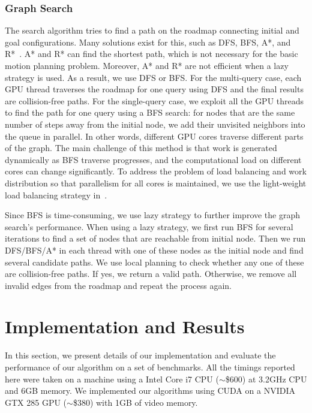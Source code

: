 \subsubsection{Graph Search}
The search algorithm tries to find a path on the roadmap connecting initial and goal configurations. Many solutions exist for this, such as DFS, BFS, A*, and R*~\cite{JK10-ICRA}. A* and R* can find the shortest path, which is not necessary for the basic motion planning problem. Moreover, A* and R* are not efficient when a lazy strategy is used. As a result, we use DFS or BFS. For the multi-query case, each GPU thread traverses the roadmap for one query using DFS and the final results are collision-free paths. For the single-query case, we exploit all the GPU threads to find the path for one query using a BFS search: for nodes that are the same number of steps away from the initial node, we add their unvisited neighbors into the queue in parallel. In other words, different GPU cores traverse different parts of the graph. The main challenge of this method is that work is generated dynamically as BFS traverse progresses, and the computational load on different cores can change significantly. To address the problem of load balancing and work distribution so that parallelism for all cores is maintained, we use the light-weight load balancing strategy in~\cite{Lauterbach10}.

Since BFS is time-consuming, we use lazy strategy to further improve the graph search's performance. When using a lazy strategy, we first run BFS for several iterations to find a set of nodes that are reachable from initial node. Then we run DFS/BFS/A* in each thread with one of these nodes as the initial node and find several candidate paths. We use local planning to check whether any one of these are collision-free paths. If yes, we return a valid path. Otherwise, we remove all invalid edges from the roadmap and repeat the process again.


\section{Implementation and Results}
\label{sec:4:result}
In this section, we present details of our implementation and evaluate the performance of our algorithm on a set of benchmarks. All the timings reported here were taken on a machine using a Intel Core i7 CPU ($\sim$\$600) at 3.2GHz CPU and 6GB memory. We implemented our algorithms using CUDA on a NVIDIA GTX 285 GPU ($\sim$\$380) with 1GB of video memory.

